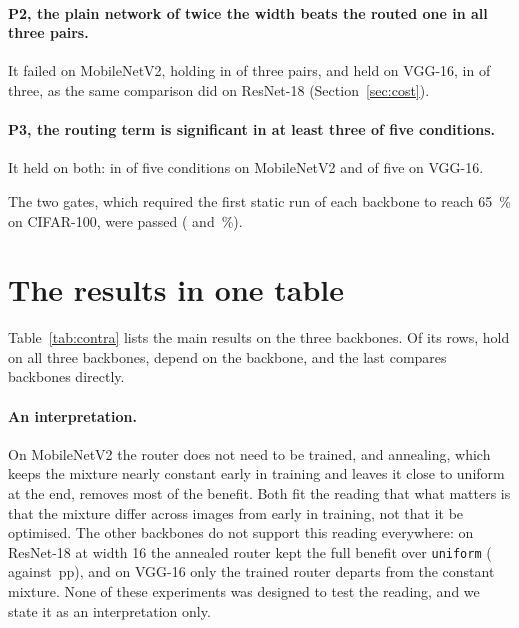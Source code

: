 \documentclass[10pt,a4paper]{article}
\begin{document}
\paragraph{P2, the plain network of twice the width beats the routed one
in all three pairs.} It failed on MobileNetV2, holding in  of three
pairs, and held on VGG-16, in  of three, as the same comparison
did on ResNet-18 (Section~\ref{sec:cost}).

\paragraph{P3, the routing term is significant in at least three of five
conditions.} It held on both: in  of five conditions on
MobileNetV2 and  of five on VGG-16.

The two gates, which required the first static run of each backbone to
reach \SI{65}{\percent} on CIFAR-100, were passed ( and
\,\%).

\section{The results in one table}\label{sec:summary}

Table~\ref{tab:contra} lists the main results on the three backbones. Of
its  rows,  hold on all three backbones,
 depend on the backbone, and the last compares backbones
directly.

\begin{table}[!htbp]\centering\small
\caption{The main results on the three backbones. Differences are in pp
and paired by seed. Status: \emph{holds on all three},
\emph{backbone-dependent} or \emph{across backbones} (a comparison
between them).}
\label{tab:contra}
\end{table}

\paragraph{An interpretation.} On MobileNetV2 the router does not need to
be trained, and annealing, which keeps the mixture nearly constant early in
training and leaves it close to uniform at the end, removes most of the
benefit. Both fit the reading that what matters is that the mixture differ
across images from early in training, not that it be optimised. The other
backbones do not support this reading everywhere: on ResNet-18 at width 16
the annealed router kept the full benefit over \texttt{uniform}
( against \,pp), and on VGG-16 only the trained router
departs from the constant mixture. None of these experiments was designed
to test the reading, and we state it as an interpretation only.
\end{document}
